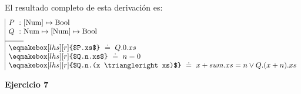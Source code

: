 \documentclass[12pt]{article}
\begin{document}
\begin{itemize}
    El resultado completo de esta derivación es:
    \[
    \begin{array}{| r @{} l }
        P ~ : ~ & [\text{Num}] \mapsto \text{Bool} \\
        \rule[-10pt]{0pt}{0pt}Q ~ : ~ & \text{Num} \mapsto [\text{Num}] \mapsto \text{Bool} \\
        \cline{1-1}
        \multicolumn{2}{|l}{\rule{0pt}{12pt}\eqmakebox[lhs][r]{$P.xs$} ~ \doteq ~ Q.0.xs} \\
        \multicolumn{2}{|l}{\eqmakebox[lhs][r]{$Q.n.xs$} ~ \doteq ~ n = 0} \\
        \multicolumn{2}{|l}{\eqmakebox[lhs][r]{$Q.n.(x \triangleright xs)$} ~ \doteq ~ x + sum.xs = n \lor Q.(x + n).xs}
    \end{array}
    \]


\end{itemize}

\textbf{Ejercicio 7}
\end{document}
